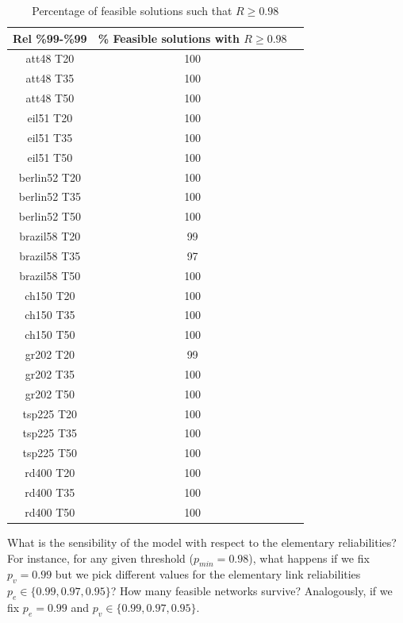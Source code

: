 \begin{table}
\caption{Percentage of feasible solutions such that $R \geq 0.98$} %
\centering  %
\begin{tabular}{|c|c|c|} %
\hline	Rel \%99-\%99   &	\% Feasible solutions with $R \geq 0.98$ \\
\hline	att48 T20	&	100	\\
\hline	att48 T35	&	100	\\
\hline	att48 T50	&	100	\\
\hline	eil51 T20	&	100	\\
\hline	eil51 T35	&	100	\\
\hline	eil51 T50	&	100	\\
\hline	berlin52 T20	&	100	\\
\hline	berlin52 T35	&	100	\\
\hline	berlin52 T50	&	100	\\
\hline	brazil58 T20	&	99	\\
\hline	brazil58 T35	&	97	\\
\hline	brazil58 T50	&	100	\\
\hline	ch150 T20	&	100	\\
\hline	ch150 T35	&	100	\\
\hline	ch150 T50	&	100	\\
\hline	gr202 T20	&	99	\\
\hline	gr202 T35	&	100	\\
\hline	gr202 T50	&	100	\\
\hline	tsp225 T20	&	100	\\
\hline	tsp225 T35	&	100	\\
\hline	tsp225 T50	&	100	\\
\hline	rd400 T20	&	100	\\
\hline	rd400 T35	&	100	\\
\hline	rd400 T50	&	100	\\
\hline
\end{tabular}
\label{answer1} %
\end{table}

\begin{question}
What is the sensibility of the model with respect to the elementary reliabilities? 
For instance, for any given threshold ($p_{min}=0.98$), what happens if we fix 
$p_v=0.99$ but we pick different values for the elementary link reliabilities 
$p_e \in \{0.99,0.97,0.95\}$? How many feasible networks survive? Analogously, if we 
fix $p_e=0.99$ and $p_v \in \{0.99, 0.97, 0.95\}$. 
\end{question}

